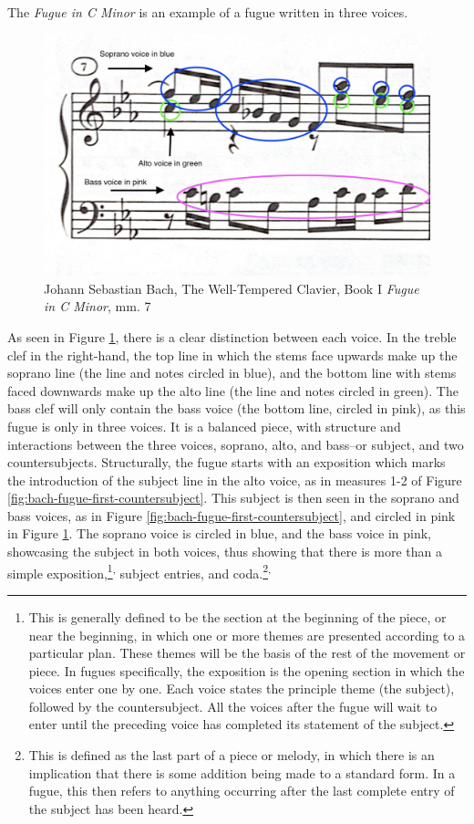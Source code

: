The \textit{Fugue in C Minor} is an example of a fugue written in three voices.
\begin{figure}
    \centering
    \includegraphics[width=.5\textwidth]{figures/fugue-three-voices.jpg}
    \caption{Johann Sebastian Bach, The Well-Tempered Clavier, Book I \textit{Fugue in C Minor}, mm. 7}
    \label{fig:bach-fugue-three-voices}
\end{figure}
As seen in Figure \ref{fig:bach-fugue-three-voices}\autocite{Henle_2009}, there is a clear distinction between each voice. In the treble clef in the right-hand, the top line in which the stems face upwards make up the soprano line (the line and notes circled in blue), and the bottom line with stems faced downwards make up the alto line (the line and notes circled in green). The bass clef will only contain the bass voice (the bottom line, circled in pink), as this fugue is only in three voices. It is a balanced piece, with structure and interactions between the three voices, soprano, alto, and bass--or subject, and two countersubjects. Structurally, the fugue starts with an exposition which marks the introduction of the subject line in the alto voice, as in measures 1-2 of Figure \ref{fig:bach-fugue-first-countersubject}\autocite{Henle_2009}. This subject is then seen in the soprano and bass voices, as in Figure \ref{fig:bach-fugue-first-countersubject}\autocite{Henle_2009}, and circled in pink in Figure \ref{fig:bach-fugue-three-voices}\autocite{Henle_2009}. The soprano voice is circled in blue, and the bass voice in pink, showcasing the subject in both voices, thus showing that there is more than a simple exposition,\footnote{This is generally defined to be the section at the beginning of the piece, or near the beginning, in which one or more themes are presented according to a particular plan. These themes will be the basis of the rest of the movement or piece. In fugues specifically, the exposition is the opening section in which the voices enter one by one. Each voice states the principle theme (the subject), followed by the countersubject. All the voices after the fugue will wait to enter until the preceding voice has completed its statement of the subject.}\textsuperscript{,}\autocite{Walker_2001b} subject entries, and coda.\footnote{This is defined as the last part of a piece or melody, in which there is an implication that there is some addition being made to a standard form. In a fugue, this then refers to anything occurring after the last complete entry of the subject has been heard.}\textsuperscript{,}\autocite{Bullivant_2001}

